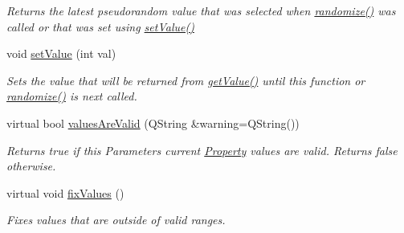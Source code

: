 \begin{DoxyCompactItemize}
\begin{DoxyCompactList}\small\item\em Returns the latest pseudorandom value that was selected when \hyperlink{class_picto_1_1_pseudorandom_int_parameter_a77d69b74839fc19dd17b3b01b348a2c0}{randomize()} was called or that was set using \hyperlink{class_picto_1_1_pseudorandom_int_parameter_a09fe82e97b538d49be2d1b0333e44e81}{set\-Value()} \end{DoxyCompactList}\item 
\hypertarget{class_picto_1_1_pseudorandom_int_parameter_a09fe82e97b538d49be2d1b0333e44e81}{void \hyperlink{class_picto_1_1_pseudorandom_int_parameter_a09fe82e97b538d49be2d1b0333e44e81}{set\-Value} (int val)}\label{class_picto_1_1_pseudorandom_int_parameter_a09fe82e97b538d49be2d1b0333e44e81}

\begin{DoxyCompactList}\small\item\em Sets the value that will be returned from \hyperlink{class_picto_1_1_pseudorandom_int_parameter_a7b6dcbd8ef6f097360cbd36a65be9196}{get\-Value()} until this function or \hyperlink{class_picto_1_1_pseudorandom_int_parameter_a77d69b74839fc19dd17b3b01b348a2c0}{randomize()} is next called. \end{DoxyCompactList}\item 
virtual bool \hyperlink{class_picto_1_1_pseudorandom_int_parameter_a8c9774951c90c41fd26ecc11cbbc03d6}{values\-Are\-Valid} (Q\-String \&warning=Q\-String())
\begin{DoxyCompactList}\small\item\em Returns true if this Parameters current \hyperlink{class_picto_1_1_property}{Property} values are valid. Returns false otherwise. \end{DoxyCompactList}\item 
virtual void \hyperlink{class_picto_1_1_pseudorandom_int_parameter_aec4d44f4f5028a327831ae4943f6b554}{fix\-Values} ()
\begin{DoxyCompactList}\small\item\em Fixes values that are outside of valid ranges. \end{DoxyCompactList}\end{DoxyCompactItemize}
